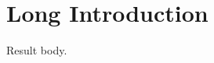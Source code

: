 \section[Short Intro]{Long Introduction}\label{sec:intro}
\begin{oblemma}[\SplitPreambleTheoremTitle]\label{obs:main}
Result body.
\end{oblemma}
